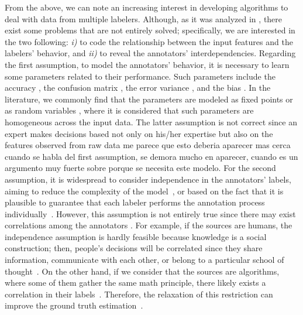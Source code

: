 \documentclass[journal]{IEEEtran}
\newcommand{\comment}[2]{{\color{blue}#1} {\color{red}#2}}
\begin{document}
From the above, we can note an increasing interest in developing
algorithms to deal with data from multiple labelers. Although, as it
was analyzed in \cite{g2019machine}, there exist some problems that
are not entirely solved; specifically, we are interested in the two
following: \textit{i)} to code the relationship between the input
features and the labelers' behavior, and \textit{ii)} to reveal the
annotators' interdependencies. Regarding the first assumption, to
model the annotators' behavior, it is necessary to learn some
parameters related to their performance. Such parameters include the
accuracy \cite{rodrigues2013learning}, the confusion matrix
\cite{gonzalez2015automatic}, the error variance
\cite{raykar2010learning}, and the bias
\cite{rodrigues2017learning}. In the literature, we commonly find that
the parameters are modeled as fixed points
\cite{rodrigues2014gaussian} or as random variables
\cite{morales2019scalable}, where it is considered that such
parameters are homogeneous across the input data. \comment{The latter
assumption is not correct since an expert makes decisions based not
only on his/her expertise but also on the features observed from raw
data \cite{raykar2010learning}}{me parece que esto deberia aparecer mas cerca cuando se habla del first assumption, se demora mucho en aparecer, cuando es un argumento muy fuerte sobre porque se necesita este modelo}. For the second assumption, it is
widespread to consider independence in the annotators' labels, aiming
to reduce the complexity of the model~\cite{venanzi2014community}, or
based on the fact that it is plausible to guarantee that each labeler
performs the annotation process
individually~\cite{tang2019leveraging}. However, this assumption is
not entirely true since there may exist correlations among the
annotators \cite{zhang2011learning}. For example, if the sources are
humans, the independence assumption is hardly feasible because
knowledge is a social construction; then, people's decisions will be
correlated since they share information, communicate with each other,
or belong to a particular school of
thought~\cite{surowiecki2005wisdom,hahn2018communication}. On the
other hand, if we consider that the sources are algorithms, where some
of them gather the same math principle, there likely exists a
correlation in their labels~\cite{zhu2019unsupervised}. Therefore, the
relaxation of this restriction can improve the ground truth
estimation~\cite{g2019machine}.
\end{document}
